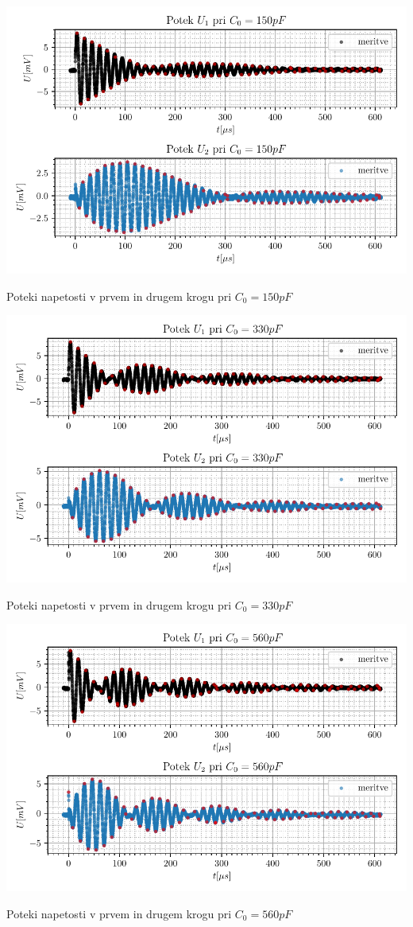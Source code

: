 \documentclass[12pt]{report}
\begin{document}
\begin{slika}[H]
  \centering
  \includegraphics{C150}
  \caption{\small Poteki napetosti v prvem in drugem krogu pri $C_0 = 150\si{pF}$}
\end{slika}

\begin{slika}[H]
  \centering
  \includegraphics{C330}
  \caption{\small Poteki napetosti v prvem in drugem krogu pri $C_0 = 330\si{pF}$}
\end{slika}

\begin{slika}[H]
  \centering
  \includegraphics{C560}
  \caption{\small Poteki napetosti v prvem in drugem krogu pri $C_0 = 560\si{pF}$}
\end{slika}
\end{document}
